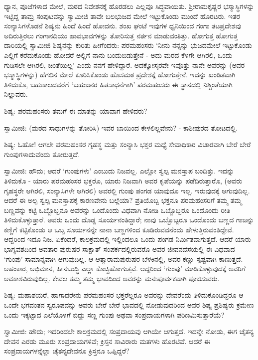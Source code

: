 ಧ್ಯಾನ, ಪೂಜೆಗಳಾದ ಮೇಲೆ, ಮಠದ ನಿವೇಶನಕ್ಕೆ ಹೊರಡಲು ಎಲ್ಲವೂ ಸಿದ್ಧವಾಯಿತು. ಶ‍್ರೀರಾಮಕೃಷ್ಣರ ಭಸ್ಮಾಸ್ಥಿಗಳನ್ನು ಇಟ್ಟಿದ್ದ ತಾಮ್ರ ಸಂಪುಟವನ್ನು ಸ್ವಾಮೀಜಿ ತಾವೇ ಬಲಭುಜದ ಮೇಲೆ ಇಟ್ಟುಕೊಂಡು ಮುಂದೆ ಹೊರಟರು. ಇತರ ಸಂನ್ಯಾಸಿಗಳೊಡನೆ ಶಿಷ್ಯನು ಹಿಂದೆ ಹಿಂದೆ ಹೋದನು. ಶಂಖ ಘಂಟೆ ಇವುಗಳ ಧ್ವನಿಯಿಂದ ಗಂಗಾ ತಟಪ್ರದೇಶವು ಅದಿರುತ್ತಿರಲು ಗಂಗಾನದಿಯು ಹಾವಭಾವಗಳನ್ನು ತೋರಿಸುತ್ತ ನರ್ತನ ಮಾಡುವಂತಿತ್ತು. ಹೋಗುತ್ತ ಹೋಗುತ್ತ ದಾರಿಯಲ್ಲಿ ಸ್ವಾಮೀಜಿ ಶಿಷ್ಯನನ್ನು ಕುರಿತು ಹೀಗೆಂದರು: ಪರಮಹಂಸರು ‘ನೀನು ನನ್ನನ್ನು ಭುಜದಮೇಲೆ ಇಟ್ಟುಕೊಂಡು ಎಲ್ಲಿಗೆ ಕರೆದುಕೊಂಡು ಹೋದರೆ ಅಲ್ಲಿಗೆ ನಾನು ಬಂದುಬಿಡುತ್ತೇನೆ - ಅದು ಮರದ ಕೆಳಗೇ ಆಗಿರಲಿ, ಒಂದು ಗುಡಿಸಲೇ ಆಗಿರಲಿ, ಚಿಂತೆಯಿಲ್ಲ’ ಎಂದು ನನಗೆ ಹೇಳಿದ್ದಾರೆ. ಅದಕ್ಕೋಸ್ಕರವೇ ಇವೊತ್ತು ನಾನೇ ಅವರನ್ನು (ಅವರ ಭಸ್ಮಾಸ್ಥಿಗಳನ್ನು) ಹೆಗಲಿನ ಮೇಲೆ ಕೂರಿಸಿಕೊಂಡು ಹೊಸಮಠ ಪ್ರದೇಶಕ್ಕೆ ಹೋಗುತ್ತೇನೆ. ಇದನ್ನು ಖಂಡಿತವಾಗಿ ತಿಳಿದುಕೊ, ಬಹುಕಾಲದವರೆಗೆ ‘ಬಹುಜನರ ಹಿತಸಾಧನೆಗಾಗಿ’ ಪರಮಹಂಸರು ಈ ಸ್ಥಾನದಲ್ಲಿ ನಿಶ್ಚಿಂತೆಯಾಗಿ ನಿಲ್ಲುವರು.

ಶಿಷ್ಯ: ಪರಮಹಂಸರು ತಮಗೆ ಈ ಮಾತನ್ನು ಯಾವಾಗ ಹೇಳಿದರು?

ಸ್ವಾಮೀಜಿ: (ಮಠದ ಸಾಧುಗಳನ್ನು ತೋರಿಸಿ) ಇವರ ಬಾಯಿಂದ ಕೇಳಲಿಲ್ಲವೇನು? - ಕಾಶೀಪುರದ ತೋಟದಲ್ಲಿ.

ಶಿಷ್ಯ: ಓಹೋ! ಆಗಲೇ ಪರಮಹಂಸರ ಗೃಹಸ್ಥ ಮತ್ತು ಸಂನ್ಯಾಸಿ ಭಕ್ತರ ಮಧ್ಯೆ ಸೇವಾಧಿಕಾರ ವಿಚಾರವಾಗಿ ಬೇರೆ ಬೇರೆ ಗುಂಪುಗಳಾದುವೆಂದು ತೋರುತ್ತದೆ.

ಸ್ವಾಮೀಜಿ: ಹೌದು; ಆದರೆ ‘ಗುಂಪುಗಳು’ ಎಂಬುದು ನಿಜವಲ್ಲ. ಎಲ್ಲೋ ಸ್ವಲ್ಪ ಮನಸ್ತಾಪ ಬಂದಿತ್ತು. ಇದನ್ನು ತಿಳಿದುಕೊ - ಯಾರು ಪರಮಹಂಸರ ಭಕ್ತರೊ, ಯಾರು ನಿಜವಾಗಿ ಅವರ ಕೃಪೆಯನ್ನು ಪಡೆದಿರುತ್ತಾರೊ, (ಅವರು ಗೃಹಸ್ಥರೇ ಆಗಿರಲಿ, ಸಂನ್ಯಾಸಿಗಳೇ ಆಗಿರಲಿ) ಅವರಲ್ಲಿ ಗುಂಪು ಪಂಗಡ ಯಾವುದೂ ಇಲ್ಲ. ಇರುವುದಕ್ಕೆ ಆಗುವುದಿಲ್ಲ. ಆದರೆ ಈ ಅಲ್ಪ ಸ್ವಲ್ಪ ಮನಸ್ತಾಪಕ್ಕೆ ಕಾರಣವೇನು ಬಲ್ಲೆಯಾ? ಪ್ರತಿಯೊಬ್ಬ ಭಕ್ತನೂ ಪರಮಹಂಸರಿಗೆ ತಮ್ಮ ತಮ್ಮ ಬಣ್ಣವನ್ನು ಕಟ್ಟಿ ಒಬ್ಬೊಬ್ಬನೂ ಅವರನ್ನು ಒಂದೊಂದು ವಿಧವಾಗಿ ನೋಡಿ ಒಬ್ಬೊಬ್ಬರೂ ಒಂದೊಂದು ರೀತಿ ತಿಳಿದುಕೊಳ್ಳುತ್ತಾರೆ. ಅವರು ಒಂದು ದೊಡ್ಡ ಸೂರ್ಯನಂತಿದ್ದಾರೆ; ನಾವು ಒಬ್ಬೊಬ್ಬರೂ ಒಂದೊಂದು ಬಣ್ಣದ ಗಾಜನ್ನು ಕಣ್ಣಿಗೆ ಕಟ್ಟಿಕೊಂಡು ಆ ಒಬ್ಬ ಸೂರ್ಯನನ್ನೇ ನಾನಾ ಬಣ್ಣಗಳಿಂದ ಕೂಡಿರುವವನೆಂದು ಹೇಳುತ್ತಿರುವಂತಿದ್ದೇವೆ. ಆದ್ದರಿಂದ ಇದೂ ನಿಜ. ಏಕೆಂದರೆ, ಕಾಲಕ್ರಮದಲ್ಲಿ ಇಲ್ಲಿಂದಲೂ ಒಂದು ಪಂಗಡ ನಿರ್ಮಿತವಾಗುತ್ತದೆ. ಆದರೆ ಯಾರು ಭಾಗ್ಯವಶದಿಂದ ಅವತಾರ ಪುರುಷರ ಸಾಕ್ಷಾತ್ ಸಂಪರ್ಕದಲ್ಲಿರುವರೊ ಅವರ ಜೀವನದೆಸೆಯಲ್ಲಿ ಈ ವಿಧವಾದ ‘ಗುಂಪು’ ಸಾಮಾನ್ಯವಾಗಿ ಆಗುವುದಿಲ್ಲ. ಆ ಆತ್ಮಾರಾಮಪುರುಷರ ಬೆಳಕಿನಲ್ಲಿ, ಅವರ ಕಣ್ಣು ಸ್ಪಷ್ಟವಾಗಿ ಕಾಣುತ್ತದೆ. ಅಹಂಕಾರ, ಅಭಿಮಾನ, ಹೀನಬುದ್ಧಿ ಎಲ್ಲಾ ಕೊಚ್ಚಿಹೋಗುತ್ತವೆ. ಆದ್ದರಿಂದ ‘ಗುಂಪು’ ಮಾಡಿಕೊಳ್ಳುವುದಕ್ಕೆ ಅವರಿಗೆ ಅವಕಾಶವಿರುವುದಿಲ್ಲ. ಕೇವಲ ತಮ್ಮ ತಮ್ಮ ಭಾವದಿಂದ ಅವರನ್ನು ಮನಃಪೂರ್ವಕವಾಗಿ ಪೂಜಿಸುವರು.

ಶಿಷ್ಯ: ಮಹಾಶಯರೆ, ಹಾಗಾದರೇನು ಪರಮಹಂಸರ ಭಕ್ತರೆಲ್ಲರೂ ಅವರನ್ನು ದೇವರೆಂದು ತಿಳಿದುಕೊಂಡಿದ್ದರೂ ಆ ಒಂದೇ ಭಗವಂತನ ಸ್ವರೂಪವನ್ನು ಅವರು ಬೇರೆ ಬೇರೆ ಭಾವದಲ್ಲಿ ನೋಡುವುದರಿಂದ ಅವರ ಶಿಷ್ಯ ಪ್ರಶಿಷ್ಯರು ಕ್ರಮೇಣ ಒಂದು ಇಕ್ಕಟ್ಟಾದ ಎಲೆಯೊಳಗೆ ಬಿದ್ದು ಸಣ್ಣ ಗುಂಪು ಅಥವಾ ಸಂಪ್ರದಾಯಗಳಾಗಿ ಪರಿಣಮಿಸುತ್ತಾರೆಯೆ?

ಸ್ವಾಮೀಜಿ: ಹೌದು; ಇದರಿಂದಲೇ ಕಾಲಕ್ರಮದಲ್ಲಿ ಸಂಪ್ರದಾಯವು ಆಗಿಯೇ ಆಗುತ್ತದೆ. ಇದನ್ನೇ ನೋಡು, ಈಗ ಚೈತನ್ಯ ದೇವನ ಎರಡು ಮೂರು ಸಂಪ್ರದಾಯಗಳಿವೆ; ಕ್ರಿಸ್ತನ ಸಾವಿರಾರು ಮತಗಳು ಹೊರಟಿವೆ. ಆದರೆ ಈ ಸಂಪ್ರದಾಯಗಳನ್ನೆಲ್ಲಾ ಚೈತನ್ಯದೇವನೂ ಕ್ರಿಸ್ತನೂ ಒಪ್ಪಿದ್ದರೆ?

